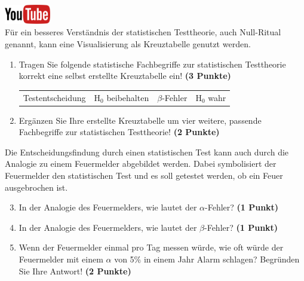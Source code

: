 \documentclass[a4paper, 9pt]{scrartcl}\usepackage[]{graphicx}\usepackage[]{xcolor}
\begin{document}
\hfill\href{https://youtu.be/Ric8ne39DtI}{\includegraphics[width =
  2cm]{img/youtube}}\\[1Ex]




F{\"u}r ein besseres Verst{\"a}ndnis der statistischen Testtheorie, auch
Null-Ritual genannt, kann eine Visualisierung als Kreuztabelle genutzt werden.  

\begin{enumerate}
\item Tragen Sie folgende statistische Fachbegriffe zur statistischen
  Testtheorie korrekt eine selbst erstellte Kreuztabelle ein! \textbf{(3
    Punkte)}
  \begin{center}
  \begin{tabular}{cccc}
  Testentscheidung & H$_0$ beibehalten & $\beta$-Fehler & H$_0$ wahr \\
  \end{tabular}
  \end{center}
\item Erg{\"a}nzen Sie Ihre erstellte Kreuztabelle um vier weitere, passende
  Fachbegriffe zur statistischen Testtheorie! \textbf{(2 Punkte)}
\end{enumerate}

Die Entscheidungsfindung durch einen statistischen Test kann auch durch die
Analogie zu einem Feuermelder abgebildet werden. Dabei symbolisiert der
Feuermelder den statistischen Test und es soll getestet werden, ob ein Feuer
ausgebrochen ist.

\begin{enumerate}
  \setcounter{enumi}{2}    
\item In der Analogie des Feuermelders, wie lautet der $\alpha$-Fehler? \textbf{(1 Punkt)}
\item In der Analogie des Feuermelders, wie lautet der $\beta$-Fehler? \textbf{(1 Punkt)}
\item Wenn der Feuermelder einmal pro Tag messen w{\"u}rde, wie oft w{\"u}rde der
  Feuermelder mit einem $\alpha$ von 5\% in einem Jahr Alarm schlagen?
  Begr{\"u}nden Sie Ihre Antwort! \textbf{(2 Punkte)}
\end{enumerate}
\end{document}
